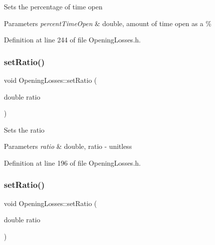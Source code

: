 Sets the percentage of time open 
\begin{DoxyParams}{Parameters}
{\em percent\+Time\+Open} & double, amount of time open as a \% \\
\hline
\end{DoxyParams}


Definition at line 244 of file Opening\+Losses.\+h.

\mbox{\label{class_opening_losses_aab7f82f24511c37f0bc4b29cbc7239b5}} 
\subsubsection{\texorpdfstring{set\+Ratio()}{setRatio()}\hspace{0.1cm}{\footnotesize\ttfamily [1/3]}}
{\footnotesize\ttfamily void Opening\+Losses\+::set\+Ratio (\begin{DoxyParamCaption}\item[{double}]{ratio }\end{DoxyParamCaption})\hspace{0.3cm}{\ttfamily [inline]}}

Sets the ratio 
\begin{DoxyParams}{Parameters}
{\em ratio} & double, ratio -\/ unitless \\
\hline
\end{DoxyParams}


Definition at line 196 of file Opening\+Losses.\+h.

\mbox{\label{class_opening_losses_aab7f82f24511c37f0bc4b29cbc7239b5}} 
\subsubsection{\texorpdfstring{set\+Ratio()}{setRatio()}\hspace{0.1cm}{\footnotesize\ttfamily [2/3]}}
{\footnotesize\ttfamily void Opening\+Losses\+::set\+Ratio (\begin{DoxyParamCaption}\item[{double}]{ratio }\end{DoxyParamCaption})\hspace{0.3cm}{\ttfamily [inline]}}

